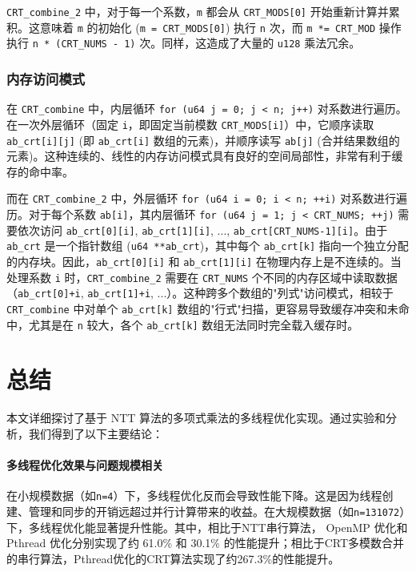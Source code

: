\documentclass[a4paper]{article}
\begin{document}
\texttt{CRT\_combine\_2} 中，对于每一个系数，\texttt{m} 都会从 \texttt{CRT\_MODS[0]} 开始重新计算并累积。这意味着 \texttt{m} 的初始化 (\texttt{m = CRT\_MODS[0]}) 执行 \texttt{n} 次，而 \texttt{m *= CRT\_MOD} 操作执行 \texttt{n * (CRT\_NUMS - 1)} 次。同样，这造成了大量的 \texttt{u128} 乘法冗余。

\subsubsection{内存访问模式}

在 \texttt{CRT\_combine} 中，内层循环 \texttt{for (u64 j = 0; j < n; j++)} 对系数进行遍历。在一次外层循环（固定 \texttt{i}，即固定当前模数 \texttt{CRT\_MODS[i]}）中，它顺序读取 \texttt{ab\_crt[i][j]} (即 \texttt{ab\_crt[i]} 数组的元素)，并顺序读写 \texttt{ab[j]} (合并结果数组的元素)。这种连续的、线性的内存访问模式具有良好的空间局部性，非常有利于缓存的命中率。

而在 \texttt{CRT\_combine\_2} 中，外层循环 \texttt{for (u64 i = 0; i < n; ++i)} 对系数进行遍历。对于每个系数 \texttt{ab[i]}，其内层循环 \texttt{for (u64 j = 1; j < CRT\_NUMS; ++j)} 需要依次访问 \texttt{ab\_crt[0][i]}, \texttt{ab\_crt[1][i]}, ..., \texttt{ab\_crt[CRT\_NUMS-1][i]}。由于 \texttt{ab\_crt} 是一个指针数组 (\texttt{u64 **ab\_crt})，其中每个 \texttt{ab\_crt[k]} 指向一个独立分配的内存块。因此，\texttt{ab\_crt[0][i]} 和 \texttt{ab\_crt[1][i]} 在物理内存上是不连续的。当处理系数 \texttt{i} 时，\texttt{CRT\_combine\_2} 需要在 \texttt{CRT\_NUMS} 个不同的内存区域中读取数据（\texttt{ab\_crt[0]+i}, \texttt{ab\_crt[1]+i}, ...）。这种跨多个数组的"列式"访问模式，相较于 \texttt{CRT\_combine} 中对单个 \texttt{ab\_crt[k]} 数组的"行式"扫描，更容易导致缓存冲突和未命中，尤其是在 \texttt{n} 较大，各个 \texttt{ab\_crt[k]} 数组无法同时完全载入缓存时。

\section{总结}

本文详细探讨了基于 NTT 算法的多项式乘法的多线程优化实现。通过实验和分析，我们得到了以下主要结论：

\paragraph{多线程优化效果与问题规模相关}

在小规模数据（如\texttt{n=4}）下，多线程优化反而会导致性能下降。这是因为线程创建、管理和同步的开销远超过并行计算带来的收益。在大规模数据（如\texttt{n=131072}）下，多线程优化能显著提升性能。其中，相比于NTT串行算法， OpenMP 优化和 Pthread 优化分别实现了约 61.0\% 和 30.1\% 的性能提升；相比于CRT多模数合并的串行算法，Pthread优化的CRT算法实现了约267.3\%的性能提升。
\end{document}

